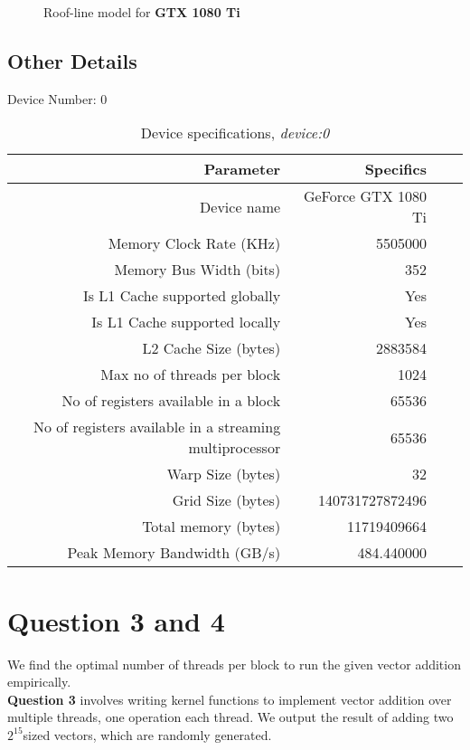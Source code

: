 \begin{figure}[ht]
\centering
\caption{Roof-line model for \textbf{GTX 1080 Ti}}
\end{figure}

  \subsection{Other Details}
Device Number: 0
  
  
  \begin{table}[ht]
\footnotesize
\centering
\begin{tabular}{r||rrr}
Parameter & Specifics  \\ 
 \hline \hline
Device name & GeForce GTX 1080 Ti \\
  Memory Clock Rate (KHz) & 5505000 \\
  Memory Bus Width (bits) & 352 \\
  Is L1 Cache supported globally & Yes \\
  Is L1 Cache supported locally & Yes \\
  L2 Cache Size (bytes) & 2883584 \\
  Max no of threads per block & 1024 \\
  No of registers available in a block & 65536 \\
  No of registers available in a streaming multiprocessor & 65536 \\
  Warp Size (bytes)&  32 \\
  Grid Size (bytes) & 140731727872496 \\
  Total memory (bytes) & 11719409664 \\
  Peak Memory Bandwidth (GB/s) & 484.440000 \\
\end{tabular}
\caption{Device specifications, \textit{device:0}}
\end{table}

\newpage

\section {Question 3 and 4}
\noindent We find the optimal number of threads per block to run the given vector addition empirically. \\

\textbf{Question 3} involves writing kernel functions to implement vector addition over multiple threads, one operation each thread. We output the result of adding two $2^{15} $sized vectors, which are randomly generated. \\

